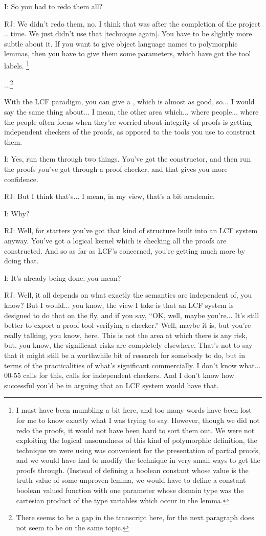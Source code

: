 \documentclass[10pt,titlepage]{book}
\begin{document}
I: So you had to redo them all?

RJ: We didn't redo them, no.
I think that was after the completion of the project ..	time.
We just didn't use that [technique again].
You have to be slightly more subtle about it.
If you want to give object language names to polymorphic lemmas, then you have to give them some parameters, which have got the tool labels. 
\footnote{
I must have been mumbling a bit here, and too many words have been lost for me to know exactly what I was trying to say.
However, though we did not redo the proofs, it would not have been hard to sort them out.
We were not exploiting the logical unsoundness of this kind of polymorphic definition, the technique we were using was convenient for the presentation of partial proofs, and we would have had to modify the technique in very small ways to get the proofs through.
(Instead of defining a boolean constant whose value is the truth value of some unproven lemma, we would have to define a constant boolean valued function with one parameter whose domain type was the cartesian product of the type variables which occur in the lemma.
}

...\footnote{
There seems to be a gap in the transcript here, for the next paragraph does not seem to be on the same topic.}

With the LCF paradigm, you can give a	, which is almost as good, so... I would say the same thing about... I mean, the other area which... where people... where the people often focus when they're worried about integrity of proofs is getting independent checkers of the proofs, as opposed to the tools you use to construct them.


I: Yes, run them through two things.
You've got the constructor, and then run the proofs you've got through a proof checker, and that gives you more confidence.

RJ: But I think that's... I mean, in my view, that's a bit academic.

I: Why?

RJ: Well, for starters you've got that kind of structure built into an LCF system anyway.
You've got a logical kernel which is checking all the proofs are constructed.
And so as far as LCF's concerned, you're getting much more by doing that.

I: It's already being done, you mean?

RJ: Well, it all depends on what exactly the semantics are independent of, you know?
But I would... you know, the view I take is that an LCF system is designed to do that on the fly, and if you say,
    ``OK, well, maybe you're... It's still better to export a proof tool verifying a checker.''
Well, maybe it is, but you're really talking, you know,	here.
This is not the area at which there is any risk, but, you know, the significant risks are completely elsewhere.
That's not to say that it might still be a worthwhile bit of research for somebody to do, but in terms of the practicalities of what's significant commercially.
I don't know what...
00-55 calls for this, calls for independent checkers.
And I don't know how successful you'd be in arguing that an LCF system would have that.
\end{document}
